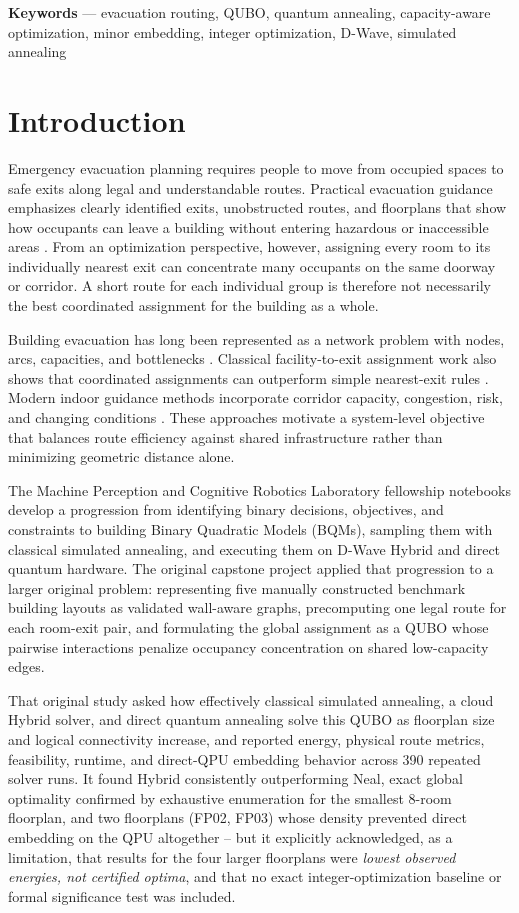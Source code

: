 \documentclass[11pt]{article}
\begin{document}
\noindent\textbf{Keywords} --- evacuation routing, QUBO, quantum annealing, capacity-aware optimization, minor embedding, integer optimization, D-Wave, simulated annealing

\section{Introduction}

Emergency evacuation planning requires people to move from occupied spaces to safe exits along legal and understandable routes. Practical evacuation guidance emphasizes clearly identified exits, unobstructed routes, and floorplans that show how occupants can leave a building without entering hazardous or inaccessible areas \cite{osha}. From an optimization perspective, however, assigning every room to its individually nearest exit can concentrate many occupants on the same doorway or corridor. A short route for each individual group is therefore not necessarily the best coordinated assignment for the building as a whole.

Building evacuation has long been represented as a network problem with nodes, arcs, capacities, and bottlenecks \cite{chalmet}. Classical facility-to-exit assignment work also shows that coordinated assignments can outperform simple nearest-exit rules \cite{kang}. Modern indoor guidance methods incorporate corridor capacity, congestion, risk, and changing conditions \cite{desmet,zhang,ye}. These approaches motivate a system-level objective that balances route efficiency against shared infrastructure rather than minimizing geometric distance alone.

The Machine Perception and Cognitive Robotics Laboratory fellowship notebooks develop a progression from identifying binary decisions, objectives, and constraints to building Binary Quadratic Models (BQMs), sampling them with classical simulated annealing, and executing them on D-Wave Hybrid and direct quantum hardware. The original capstone project applied that progression to a larger original problem: representing five manually constructed benchmark building layouts as validated wall-aware graphs, precomputing one legal route for each room-exit pair, and formulating the global assignment as a QUBO whose pairwise interactions penalize occupancy concentration on shared low-capacity edges.

That original study asked how effectively classical simulated annealing, a cloud Hybrid solver, and direct quantum annealing solve this QUBO as floorplan size and logical connectivity increase, and reported energy, physical route metrics, feasibility, runtime, and direct-QPU embedding behavior across 390 repeated solver runs. It found Hybrid consistently outperforming Neal, exact global optimality confirmed by exhaustive enumeration for the smallest 8-room floorplan, and two floorplans (FP02, FP03) whose density prevented direct embedding on the QPU altogether -- but it explicitly acknowledged, as a limitation, that results for the four larger floorplans were \emph{lowest observed energies, not certified optima}, and that no exact integer-optimization baseline or formal significance test was included.
\end{document}
